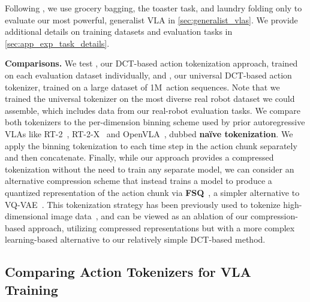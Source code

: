 Following \citet{black2024pi_0}, we use grocery bagging, the toaster task, and laundry folding only to evaluate our most powerful, generalist VLA in \cref{sec:generalist_vlas}. We provide additional details on training datasets and evaluation tasks in \cref{sec:app_exp_task_details}.

\noindent\textbf{Comparisons.}
We test \textbf{\ModelAcronym}, our DCT-based action tokenization approach, trained on each evaluation dataset individually, and \textbf{\ModelUniversalAcronym}, our universal DCT-based action tokenizer, trained on a large dataset of 1M~action sequences. Note that we trained the universal tokenizer on the most diverse real robot dataset we could assemble, which includes data from our real-robot evaluation tasks. We compare both tokenizers to the per-dimension binning scheme used by prior autoregressive VLAs like RT-2~\citep{rt22023arxiv}, RT-2-X~\citep{open_x_embodiment_rt_x_2023} and OpenVLA~\citep{kim2024openvla}, dubbed \textbf{na\"{i}ve tokenization}. We apply the binning tokenization to each time step in the action chunk separately and then concatenate. Finally, while our approach provides a compressed tokenization without the need to train any separate model, we can consider an alternative compression scheme that instead trains a model to produce a quantized representation of the action chunk via \textbf{FSQ}~\cite{fsq}, a simpler alternative to VQ-VAE~\cite{vqvae}. This tokenization strategy has been previously used to tokenize high-dimensional image data~\citep{fsq,yu2023magvit}, and can be viewed as an ablation of our compression-based approach, utilizing compressed representations but with a more complex learning-based alternative to our relatively simple DCT-based method.

\subsection{Comparing Action Tokenizers for VLA Training}
\label{sec:main_comparison}


